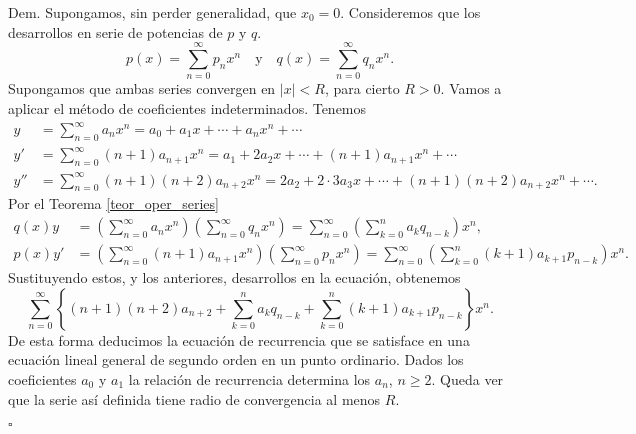 \documentclass{article}
\newenvironment{demo}{\noindent\emph{Dem.}}{{\hspace*{\fill}$\square$} \newline\vspace{5pt}}
\newcounter{defi_cont}
\newcounter{teor_cont}
\renewcommand{\emph}[1]{\textcolor[rgb]{0,0,1}{#1}}
\begin{document}
\begin{demo}
Supongamos, sin perder generalidad, que $x_0=0$. Consideremos que los desarrollos en serie de potencias de $p$ y $q$.
\begin{equation}\label{eq:series_p_q}p(x)=\sum_{n=0}^{\infty}p_nx^n\quad\text{y}\quad q(x)=\sum_{n=0}^{\infty}q_nx^n.
\end{equation}
Supongamos que ambas series convergen en $|x|<R$, para cierto $R>0$. Vamos a aplicar el método de coeficientes indeterminados. Tenemos
\[
    \begin{split}
      y&=\sum_{n=0}^{\infty}a_nx^n=a_0+a_1x+\cdots+a_nx^n+\cdots\\
      y'&=\sum_{n=0}^{\infty}(n+1)a_{n+1}x^n=a_1+2a_2x+\cdots+(n+1)a_{n+1}x^n+\cdots\\
      y''&=\sum_{n=0}^{\infty}(n+1)(n+2)a_{n+2}x^n= 2a_2+2\cdot 3a_3x+\cdots+(n+1)(n+2)a_{n+2}x^n+\cdots.
    \end{split}
\]
Por el  Teorema \ref{teor_oper_series} 
\[
   \begin{split}
     q(x)y&=\left(\sum_{n=0}^{\infty}a_nx^n\right)\left(\sum_{n=0}^{\infty}q_nx^n\right)=\sum_{n=0}^{\infty}\left(\sum_{k=0}^na_kq_{n-k}\right)x^n,\\
     p(x)y'&=\left(\sum_{n=0}^{\infty}(n+1)a_{n+1}x^n\right)\left(\sum_{n=0}^{\infty}p_nx^n\right)=\sum_{n=0}^{\infty}\left(\sum_{k=0}^n(k+1)a_{k+1}p_{n-k}\right)x^n.
   \end{split}
\]
Sustituyendo estos, y los anteriores, desarrollos en la ecuación, obtenemos
\[\sum_{n=0}^{\infty}\left\{ (n+1)(n+2)a_{n+2}+ \sum_{k=0}^na_kq_{n-k}+ \sum_{k=0}^n(k+1)a_{k+1}p_{n-k} \right\}x^n.\]
De esta forma deducimos la ecuación de recurrencia que se satisface en una ecuación lineal general de segundo orden en un punto ordinario.
Dados los coeficientes $a_0$ y $a_1$ la relación de recurrencia determina los $a_n$, $n\geq 2$. Queda ver que la serie así definida tiene radio de convergencia al menos $R$. 


\end{demo}
\end{document}
